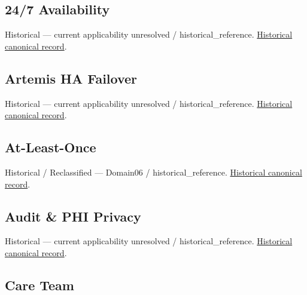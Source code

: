 \subsection{24/7 Availability}

\par\label{element:782f53e2190f4a8a8d0dc0a33cd6fbb3}
Historical — current applicability unresolved / historical\_reference. \href{../../../../continuum/motivation/driver/782f53e2190f4a8a8d0dc0a33cd6fbb3.md}{Historical canonical record}.\par

\subsection{Artemis HA Failover}

\par\label{element:8c0f08d0d12f48b9ae6a001c19ede377}
Historical — current applicability unresolved / historical\_reference. \href{../../../../continuum/motivation/requirement/8c0f08d0d12f48b9ae6a001c19ede377.md}{Historical canonical record}.\par

\subsection{At-Least-Once}

\par\label{element:bd4c8726125648e68d5746bab3c765cd}
Historical / Reclassified — Domain06 / historical\_reference. \href{../../../../continuum/motivation/principle/bd4c8726125648e68d5746bab3c765cd.md}{Historical canonical record}.\par

\subsection{Audit \& PHI Privacy}

\par\label{element:499313a0a5d84520a3061120ae9b6dac}
Historical — current applicability unresolved / historical\_reference. \href{../../../../continuum/motivation/driver/499313a0a5d84520a3061120ae9b6dac.md}{Historical canonical record}.\par

\subsection{Care Team}

